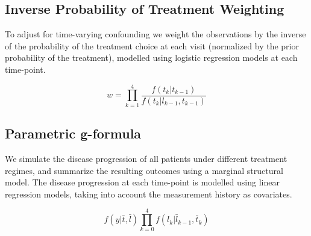 \documentclass[a0,portrait]{a0poster}\usepackage[]{graphicx}\usepackage[svgnames]{xcolor}
\begin{document}
\begin{multicols}{2}
\vspace{0.5cm}
\begin{tcolorbox}[colback=LBlue!15!white,colframe=LBlue!15!white,boxsep=0.25cm]
\color{DarkSlateGray}
\subsection*{Inverse Probability of Treatment Weighting}
\begin{minipage}[t]{0.6\textwidth}
To adjust for time-varying confounding we weight the observations by the inverse of the probability of the treatment choice at each visit (normalized by the prior probability of the treatment), modelled using logistic regression models at each time-point.
\end{minipage}
\begin{minipage}[t]{0.4\textwidth}
\large
$$w = \prod_{k=1}^4 \frac{f(t_k | t_{k-1})}{f(t_k | l_{k-1}, t_{k-1})}$$
\end{minipage}
\end{tcolorbox}

\vspace{0.5cm}
\begin{tcolorbox}[colback=LBlue!15!white,colframe=LBlue!15!white,boxsep=0.25cm]
\color{DarkSlateGray}
\subsection*{Parametric g-formula}
\begin{minipage}[t]{0.6\textwidth}
We simulate the disease progression of all patients under different treatment regimes, and summarize the resulting outcomes using a marginal structural model. The disease progression at each time-point is modelled using linear regression models, taking into account the measurement history as covariates.
\end{minipage}
\begin{minipage}[t]{0.4\textwidth}
\large
$$f(y|\bar{t}, \bar{l}) \prod_{k=0}^4 f(l_k | \bar{l}_{k-1}, \bar{t}_{k})$$
\end{minipage}
\end{tcolorbox}
\vspace{-2cm}


\end{multicols}
\end{document}
